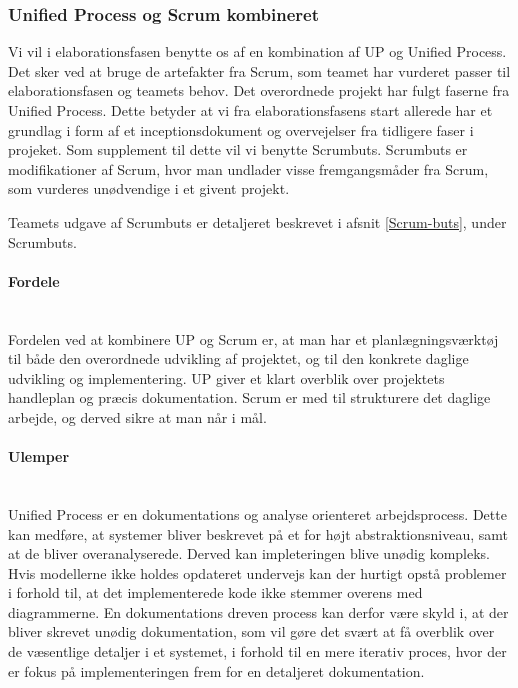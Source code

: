 \documentclass[../../main.tex]{subfiles}
\begin{document}
\subsubsection{Unified Process og Scrum kombineret}
Vi vil i elaborationsfasen benytte os af en kombination af UP og Unified Process. Det sker ved at bruge de artefakter fra Scrum, som teamet har vurderet passer til elaborationsfasen og teamets behov. Det overordnede projekt har fulgt faserne fra Unified Process. Dette betyder at vi fra elaborationsfasens start allerede har et grundlag i form af et inceptionsdokument og overvejelser fra tidligere faser i projeket.
Som supplement til dette vil vi benytte Scrumbuts. Scrumbuts er modifikationer af Scrum, hvor man undlader visse fremgangsmåder fra Scrum, som vurderes unødvendige i et givent projekt.   

Teamets udgave af Scrumbuts er detaljeret beskrevet i afsnit \ref{Scrum-buts}, under Scrumbuts.

\paragraph{Fordele}\mbox{}\\
Fordelen ved at kombinere UP og Scrum er, at man har et planlægningsværktøj til både den overordnede udvikling af projektet, og til den konkrete daglige udvikling og implementering. UP giver et klart overblik over projektets handleplan og præcis dokumentation. Scrum er med til strukturere det daglige arbejde, og derved sikre at man når i mål.    

\paragraph{Ulemper}\mbox{}\\
Unified Process er en dokumentations og analyse orienteret arbejdsprocess. Dette kan medføre, at systemer bliver beskrevet på et for højt abstraktionsniveau, samt at de  bliver overanalyserede. Derved kan impleteringen blive unødig kompleks. Hvis modellerne ikke holdes opdateret undervejs kan der hurtigt opstå problemer i forhold til, at det implementerede kode ikke stemmer overens med diagrammerne. En dokumentations dreven process kan derfor være skyld i, at der bliver skrevet unødig dokumentation, som vil gøre det svært at få overblik over de væsentlige detaljer i et systemet, i forhold til en mere iterativ proces, hvor der er fokus på implementeringen frem for en detaljeret dokumentation.
\end{document}
